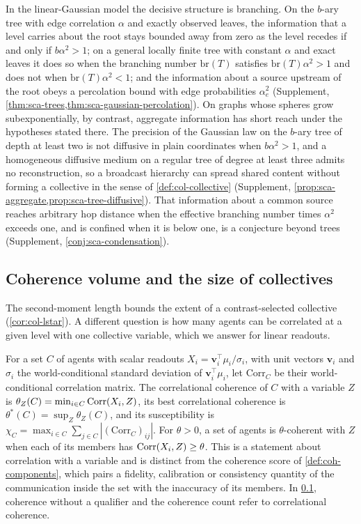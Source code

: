 In the linear-Gaussian model the decisive structure is branching. On the $b$-ary tree with edge correlation $\alpha$ and exactly observed leaves, the information that a level carries about the root stays bounded away from zero as the level recedes if and only if $b\alpha^2>1$; on a general locally finite tree with constant $\alpha$ and exact leaves it does so when the branching number $\mathrm{br}(T)$ satisfies $\mathrm{br}(T)\alpha^2>1$ and does not when $\mathrm{br}(T)\alpha^2<1$; and the information about a source upstream of the root obeys a percolation bound with edge probabilities $\alpha_e^2$ (Supplement, \cref{thm:sca-trees,thm:sca-gaussian-percolation}). On graphs whose spheres grow subexponentially, by contrast, aggregate information has short reach under the hypotheses stated there. The precision of the Gaussian law on the $b$-ary tree of depth at least two is not diffusive in plain coordinates when $b\alpha^2>1$, and a homogeneous diffusive medium on a regular tree of degree at least three admits no reconstruction, so a broadcast hierarchy can spread shared content without forming a collective in the sense of \cref{def:col-collective} (Supplement, \cref{prop:sca-aggregate,prop:sca-tree-diffusive}). That information about a common source reaches arbitrary hop distance when the effective branching number times $\alpha^2$ exceeds one, and is confined when it is below one, is a conjecture beyond trees (Supplement, \cref{conj:sca-condensation}).

\subsection{Coherence volume and the size of collectives}\label{sec:sca-volume}

The second-moment length bounds the extent of a contrast-selected collective (\cref{cor:col-lstar}). A different question is how many agents can be correlated at a given level with one collective variable, which we answer for linear readouts.

\begin{definition}\label{def:sca-coherence}
For a set $C$ of agents with scalar readouts $X_i=\mathbf v_i^\top\mu_i/\sigma_i$, with unit vectors $\mathbf v_i$ and $\sigma_i$ the world-conditional standard deviation of $\mathbf v_i^\top\mu_i$, let $\mathrm{Corr}_C$ be their world-conditional correlation matrix. The correlational coherence of $C$ with a variable $Z$ is $\theta_Z(C)=\min_{i\in C}\operatorname{Corr}(X_i,Z)$, its best correlational coherence is $\theta^\ast(C)=\sup_Z\theta_Z(C)$, and its susceptibility is $\chi_C=\max_{i\in C}\sum_{j\in C}|(\mathrm{Corr}_C)_{ij}|$. For $\theta>0$, a set of agents is $\theta$-coherent with $Z$ when each of its members has $\operatorname{Corr}(X_i,Z)\ge\theta$. This is a statement about correlation with a variable and is distinct from the coherence score of \cref{def:coh-components}, which pairs a fidelity, calibration or consistency quantity of the communication inside the set with the inaccuracy of its members. In \cref{sec:sca-volume}, coherence without a qualifier and the coherence count refer to correlational coherence.
\end{definition}

